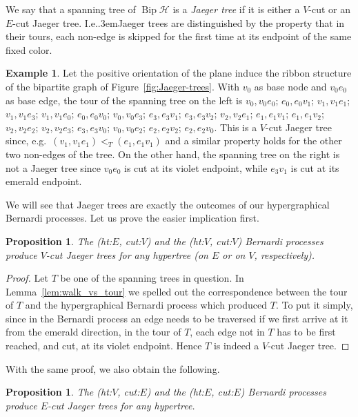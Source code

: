 \documentclass[10pt]{amsart}
\newtheorem{prop}[theo]{Proposition}
\theoremstyle{definition}\newtheorem{defi}[theo]{Definition}
\newtheorem{exam}[theo]{Example}
\theoremstyle{remark}\newtheorem{rema}[theo]{Remark}
\newcommand{\eg}{e.g.\ }\newcommand{\ie}{i.e.\ }\newcommand{\resp}{resp.\ }\newcommand{\cf}{cf.\ }
\newcommand{\HH}{\mathcal H}
\newcommand\Ie{I.e.\kern.3em}
\DeclareMathOperator{\Bip}{Bip}
\begin{document}
We say that a spanning tree of $\Bip \HH$ is a \emph{Jaeger tree} if it is either a $V$-cut or an $E$-cut Jaeger tree. \Ie Jaeger trees are distinguished by the property that in their tours, each non-edge is skipped for the first time at its endpoint of the same fixed color. 

\begin{exam}
\label{ex:kektura}
Let the positive orientation of the plane induce the ribbon structure of the bipartite graph of Figure~\ref{fig:Jaeger-trees}. With $v_0$ as base node and $v_0e_0$ as base edge, the tour of the spanning tree on the left is $v_0, v_0e_0$; $e_0,e_0v_1$; $v_1, v_1e_1$; $v_1, v_1e_3$; $v_1, v_1e_0$; $e_0,e_0v_0$; $v_0,v_0e_3$; $e_3,e_3v_1$; $e_3,e_3v_2$; $v_2, v_2e_1$; $e_1, e_1v_1$; $e_1, e_1v_2$; $v_2, v_2e_2$; $v_2,v_2e_3$; $e_3, e_3v_0$; $v_0, v_0e_2$; $e_2, e_2v_2$; $e_2, e_2v_0$. This is a $V$-cut Jaeger tree since, \eg $(v_1,v_1e_1)<_T (e_1, e_1v_1)$ and a similar property holds for the other two non-edges of the tree. On the other hand, the spanning tree on the right is not a Jaeger tree since $v_0e_0$ is cut at its violet endpoint, while $e_3v_1$ is cut at its emerald endpoint.
\end{exam}

We will see that Jaeger trees are exactly the outcomes of our hypergraphical Bernardi processes. Let us prove the easier implication first.

\begin{prop}
\label{prop:bernardi->jaeger}
The (ht:$E$, cut:$V$) and the (ht:$V$, cut:$V$) Bernardi processes produce $V$-cut Jaeger trees for any hypertree (on $E$ or on $V$, respectively).
\end{prop}

\begin{proof}
Let $T$ be one of the spanning trees in question. In Lemma~\ref{lem:walk_vs_tour} we spelled out the correspondence between the tour of $T$ and the hypergraphical Bernardi process which produced $T$. To put it simply, since in the Bernardi process an edge needs to be traversed if we first arrive at it from the emerald direction, in the tour of $T$, each edge not in $T$ has to be first reached, and cut, at its violet endpoint. Hence $T$ is indeed a $V$-cut Jaeger tree.
\end{proof}

With the same proof, we also obtain the following.

\begin{prop} \label{p:B-trees_are_J-trees}
The (ht:$V$, cut:$E$) and the (ht:$E$, cut:$E$) Bernardi processes produce $E$-cut Jaeger trees for any hypertree.
\end{prop}
\end{document}

